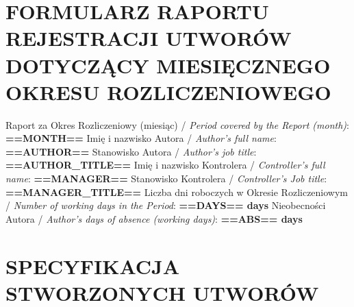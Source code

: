 \documentclass[10pt]{report}
\begin{document}
	\section*{FORMULARZ RAPORTU REJESTRACJI UTWORÓW DOTYCZĄCY MIESIĘCZNEGO OKRESU ROZLICZENIOWEGO}
		
	{\small Raport za Okres Rozliczeniowy (miesiąc) / \textit{Period covered by the Report (month)}: \textbf{==MONTH==}}\newline
	{\small Imię i nazwisko Autora / \textit{Author's full name}: \textbf{==AUTHOR==}}\newline
	{\small Stanowisko Autora / \textit{Author's job title}: \textbf{==AUTHOR_TITLE==}}\newline
	{\small Imię i nazwisko Kontrolera / \textit{Controller's full name}: \textbf{==MANAGER==}}\newline
	{\small Stanowisko Kontrolera / \textit{Controller's Job title}: \textbf{==MANAGER_TITLE==}}\newline
	{\small Liczba dni roboczych w Okresie Rozliczeniowym / \textit{Number of working days in the Period}: \textbf{==DAYS== days}}\newline
	{\small Nieobecności Autora / \textit{Author's days of absence (working days)}: \textbf{==ABS== days}}\newline
	
	\section*{SPECYFIKACJA STWORZONYCH UTWORÓW}
		
\end{document}
